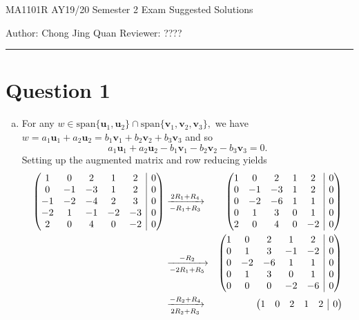\documentclass{article}
\makeatletter
\newcommand{\spn}{\text{span}}
\newenvironment{rowequmat}[1]{\left(\array{@{}#1@{}}}{\endarray\right)}
\makeatother
\begin{document}
    {\LARGE{MA1101R AY19/20 Semester 2 Exam Suggested Solutions}}
    \vspace{0.2in}
    
    Author: Chong Jing Quan \hfill Reviewer: ????
    
    \par\noindent\rule{\textwidth}{0.4pt}
\section*{Question 1}
\begin{enumerate}[(a)]
    \item For any $w\in\spn\{\textbf{u}_1,\textbf{u}_2\}\cap\spn\{\textbf{v}_1,\textbf{v}_2,\textbf{v}_3\},$ we have $w=a_1\textbf{u}_1+a_2\textbf{u}_2=b_1\textbf{v}_1+b_2\textbf{v}_2+b_3\textbf{v}_3$ and so $$a_1\textbf{u}_1+a_2\textbf{u}_2-b_1\textbf{v}_1-b_2\textbf{v}_2-b_3\textbf{v}_3=0.$$
    Setting up the augmented matrix and row reducing yields
    \begin{eqnarray*}\begin{rowequmat}{ccccc|c}
     1 &  0 & 2 & 1 & 2&0\\
     0 &  -1 & -3 & 1& 2&0 \\
     -1 &  -2 & -4 & 2&3&0 \\
     -2 & 1 & -1 & -2&-3&0\\
     2 & 0 & 4 & 0&-2&0
\end{rowequmat}&\xrightarrow[-R_1+R_3]{2R_1+R_4}&\begin{rowequmat}{ccccc|c}
     1 &  0 & 2 & 1&2&0 \\
     0 &  -1 & -3 & 1&2&0 \\
     0 & -2 & -6 & 1&1&0\\
     0 & 1 & 3 & 0 &1&0\\
     2&0&4&0&-2&0
\end{rowequmat}\\
&\xrightarrow[-2R_1+R_5]{-R_2}&\begin{rowequmat}{ccccc|c}
     1 &  0 & 2 & 1&2&0 \\
     0 &  1 & 3 & -1&-2&0 \\
     0 & -2 & -6 & 1&1&0\\
     0 & 1 & 3 & 0 &1&0\\
     0&0&0&-2&-6&0
\end{rowequmat}\\
&\xrightarrow[2R_2+R_3]{-R_2+R_4}&\begin{rowequmat}{ccccc|c}
     1 &  0 & 2 & 1&2&0 \\

\end{rowequmat}
\end{eqnarray*}
\end{enumerate}
\end{document}
